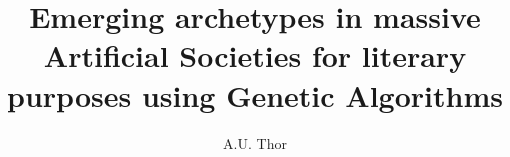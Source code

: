 \documentclass[runningheads]{llncs}
\begin{document}
\mainmatter  %





\title{Emerging archetypes in massive Artificial Societies for literary purposes using Genetic Algorithms}


\author{A.U. Thor}
%






\maketitle


\end{document}
